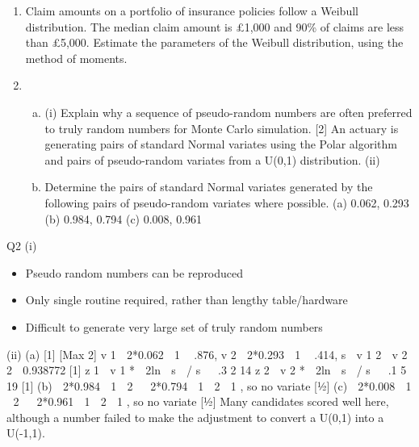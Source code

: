 \documentclass[a4paper,12pt]{article}
\begin{document}
\begin{enumerate}
\item %
Claim amounts on a portfolio of insurance policies follow a Weibull distribution. The median claim amount is £1,000 and 90\% of claims are less than £5,000.
Estimate the parameters of the Weibull distribution, using the method of moments. 
\item %
\begin{enumerate}[(a)]
\item (i)
Explain why a sequence of pseudo-random numbers are often preferred to truly random numbers for Monte Carlo simulation.
[2]
An actuary is generating pairs of standard Normal variates using the Polar algorithm and pairs of pseudo-random variates from a U(0,1) distribution.
(ii)
\item Determine the pairs of standard Normal variates generated by the following pairs of pseudo-random variates where possible.
(a) 0.062, 0.293
(b) 0.984, 0.794
(c) 0.008, 0.961
\end{enumerate}
\end{enumerate}
\newpage
Q2
(i)
\begin{itemize}
\item Pseudo random numbers can be reproduced 
\item Only single routine required, rather than lengthy table/hardware 
\item Difficult to generate very large set of truly random numbers
\end{itemize}
(ii)
(a)
[1]
[Max 2]
v 1  2*0.062  1  .876, v 2  2*0.293  1  .414,
s  v 1 2  v 2 2  0.938772
[1]
z 1  v 1 *  2ln  s  / s   .3 2 14
z 2  v 2 *  2ln  s  / s   .1 5 19 [1]
(b)  2*0.984  1  2   2*0.794  1  2  1 , so no variate [1⁄2]
(c)  2*0.008  1  2   2*0.961  1  2  1 , so no variate [1⁄2]
Many candidates scored well here, although a number failed to make
the adjustment to convert a U(0,1) into a U(-1,1).
\end{document}
